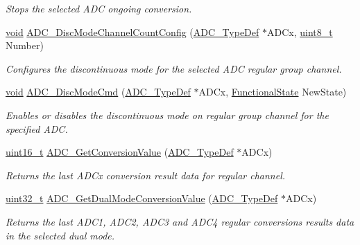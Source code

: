 \begin{DoxyCompactItemize}
\begin{DoxyCompactList}\small\item\em Stops the selected A\-D\-C ongoing conversion. \end{DoxyCompactList}\item 
\hyperlink{group___n_a_m_e_ga18028b8badbf1ea7e704ccac3c488e82}{void} \hyperlink{group___a_d_c___exported___constants_ga6eb241ba82d67d1371136c9132083937}{A\-D\-C\-\_\-\-Disc\-Mode\-Channel\-Count\-Config} (\hyperlink{struct_a_d_c___type_def}{A\-D\-C\-\_\-\-Type\-Def} $\ast$A\-D\-Cx, \hyperlink{stdint_8h_aba7bc1797add20fe3efdf37ced1182c5}{uint8\-\_\-t} Number)
\begin{DoxyCompactList}\small\item\em Configures the discontinuous mode for the selected A\-D\-C regular group channel. \end{DoxyCompactList}\item 
\hyperlink{group___n_a_m_e_ga18028b8badbf1ea7e704ccac3c488e82}{void} \hyperlink{group___a_d_c___exported___constants_ga1909649d10253ce88d986ffbb94a4be6}{A\-D\-C\-\_\-\-Disc\-Mode\-Cmd} (\hyperlink{struct_a_d_c___type_def}{A\-D\-C\-\_\-\-Type\-Def} $\ast$A\-D\-Cx, \hyperlink{group___exported__types_gac9a7e9a35d2513ec15c3b537aaa4fba1}{Functional\-State} New\-State)
\begin{DoxyCompactList}\small\item\em Enables or disables the discontinuous mode on regular group channel for the specified A\-D\-C. \end{DoxyCompactList}\item 
\hyperlink{stdint_8h_a273cf69d639a59973b6019625df33e30}{uint16\-\_\-t} \hyperlink{group___a_d_c___exported___constants_gaaf74221c285ec5dab5e66baf7bec6bd3}{A\-D\-C\-\_\-\-Get\-Conversion\-Value} (\hyperlink{struct_a_d_c___type_def}{A\-D\-C\-\_\-\-Type\-Def} $\ast$A\-D\-Cx)
\begin{DoxyCompactList}\small\item\em Returns the last A\-D\-Cx conversion result data for regular channel. \end{DoxyCompactList}\item 
\hyperlink{stdint_8h_a435d1572bf3f880d55459d9805097f62}{uint32\-\_\-t} \hyperlink{group___a_d_c___exported___constants_ga0badb39841510dc098a73be8c6b995e8}{A\-D\-C\-\_\-\-Get\-Dual\-Mode\-Conversion\-Value} (\hyperlink{struct_a_d_c___type_def}{A\-D\-C\-\_\-\-Type\-Def} $\ast$A\-D\-Cx)
\begin{DoxyCompactList}\small\item\em Returns the last A\-D\-C1, A\-D\-C2, A\-D\-C3 and A\-D\-C4 regular conversions results data in the selected dual mode. \end{DoxyCompactList}\item 

\end{DoxyCompactItemize}
